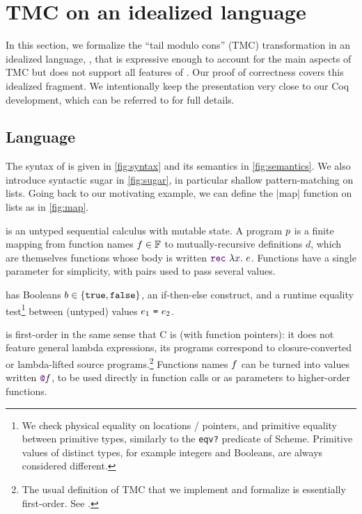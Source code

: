 \section{TMC on an idealized language}
\label{sec:formalization}

In this section, we formalize the ``tail modulo cons'' (TMC) transformation in an idealized language, \DataLang, that is expressive enough to account for the main aspects of TMC but does not support all features of \OCaml.
Our proof of correctness covers this idealized fragment.
We intentionally keep the presentation very close to our Coq development, which can be referred to for full details.






\subsection{Language}

The syntax of \DataLang is given in \cref{fig:syntax} and its semantics in \cref{fig:semantics}.
We also introduce syntactic sugar in \cref{fig:sugar}, in particular shallow pattern-matching on lists.
Going back to our motivating example, we can define the \datalang|map| function on lists as in \cref{fig:map}.

\DataLang is an untyped sequential calculus with mutable state. A \DataLang program $\datalangProg$ is a finite mapping from function names $\datalangFn \in \datalangFn[]$ to mutually-recursive definitions $d$, which are themselves functions whose body is written $\datalangRec \datalangVar \datalangExpr$. Functions have a single parameter for simplicity, with pairs used to pass several values.

\DataLang has Booleans $b \in \{\texttt{true}, \texttt{false}\}$, an if-then-else construct, and a runtime equality test\footnote{We check physical equality on locations / pointers, and primitive equality between primitive types, similarly to the \texttt{eqv?} predicate of Scheme. Primitive values of distinct types, for example integers and Booleans, are always considered different.} between (untyped) values $\datalangEq{\datalangExpr_1}{\datalangExpr_2}$.

\DataLang is first-order in the same sense that C is (with function pointers): it does not feature general lambda expressions, its programs correspond to closure-converted or lambda-lifted source programs.\footnote{
The usual definition of TMC that we implement and formalize is essentially first-order.%
 See .}
Functions names $\datalangFn$ can be turned into values written $\datalangFnptr{\datalangFn}$, to be used directly in function calls or as parameters to higher-order functions.

